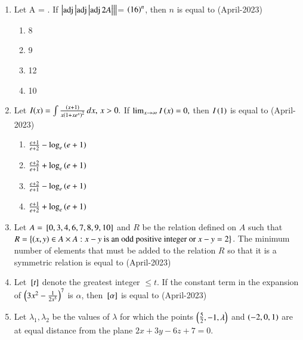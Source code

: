 \documentclass[journal]{IEEEtran}
\numberwithin{equation}{enumi}
\numberwithin{figure}{enumi}
\begin{document}
\begin{enumerate}[start=16]
\begin{multicols}{4}
\begin{enumerate}
    \item 20
    \item 18
    \end{enumerate}
\end{multicols}
\item Let A =   . If  $\left\vert\operatorname{adj}\left\vert\operatorname{adj}\left\vert\operatorname{adj}2A\right\vert\right\vert\right\vert$= $\left(16\right)^n$, then $n$ is equal to
\hfill(April-2023)
\begin{multicols}{4}
    \begin{enumerate}
    \item 8
    \item 9
    \item 12
    \item 10
    \end{enumerate}
\end{multicols}
\item Let \( I(x) = \int \frac{\left(x+1\right)}{x\left(1 + x e^x\right)^2} \, dx, \, x > 0. \) If \( \lim_{x \to \infty} I\left(x\right) = 0, \) then \( I\left(1\right) \) is equal to
\hfill(April-2023)
\begin{multicols}{2}
    \begin{enumerate}
    \item  $\frac{e+1}{e+2} - \log_e\left(e+1\right) $
    \item  $\frac{e+2}{e+1} + \log_e\left(e+1\right)$ 
    \item  $\frac{e+2}{e+1} - \log_e\left(e+1\right) $
    \item  $\frac{e+1}{e+2} + \log_e\left(e+1\right) $
\end{enumerate}
\end{multicols}
\item   Let $A = {}\left[0, 3, 4, 6, 7, 8, 9, 10\right]$ and $R$ be the relation defined on $A$ such that $R = \left\{(x, y) \in A \times A : x - y \text{ is an odd positive integer or } x - y = 2 \right\}$. The minimum number of elements that must be added to the relation $R$ so that it is a symmetric relation is equal to 
\hfill(April-2023)
\item Let ${}\left[t\right]$ denote the greatest integer $\leq t$. If the constant term in the expansion of $\left(3x^2 - \frac{1}{2x^5}\right)^7$ is $\alpha$, then ${}\left[\alpha\right]$  is equal to 
\hfill(April-2023)
\item Let $\lambda_1, \lambda_2$ be the values of $\lambda$ for which the points 
$\left(\frac{5}{2}, -1, \lambda\right)$ and $\left(-2, 0, 1\right)$ 
are at equal distance from the plane $2x + 3y - 6z + 7 = 0$. 

\end{enumerate}
\end{document}
